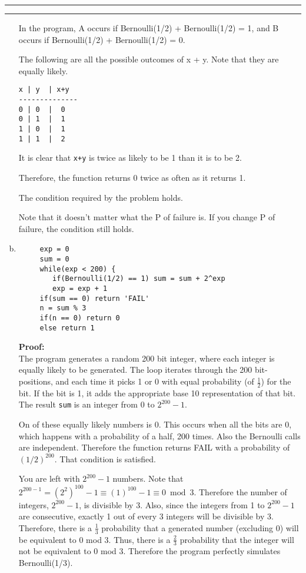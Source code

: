 \documentclass[11pt]{article}
\newcounter{questionCounter}
\newcounter{partCounter}[questionCounter]
\newenvironment{question}[2][\arabic{questionCounter}]{%
    \setcounter{partCounter}{0}%
    \vspace{.25in} \hrule \vspace{0.5em}%
        \noindent{\bf #2}%
    \vspace{0.8em} \hrule \vspace{.10in}%
    \addtocounter{questionCounter}{1}%
}{}
\begin{document}
\begin{question}{Don't Eat the Mushroom}
\begin{enumerate}[a.]
In the program, A occurs if Bernoulli(1/2) + Bernoulli(1/2) = 1,
and B occurs if Bernoulli(1/2) + Bernoulli(1/2) = 0.

The following are all the possible outcomes of x + y. Note that they are 
equally likely.

\begin{verbatim}
x | y  | x+y
--------------
0 | 0  |  0
0 | 1  |  1
1 | 0  |  1
1 | 1  |  2
\end{verbatim}

It is clear that \verb-x+y- is twice as likely to be 1 than it is to be 2.

Therefore, the function returns 0 twice as often as it returns 1.

The condition required by the problem holds.

Note that it doesn't matter what the P of failure is.
If you change P of failure, the condition still holds.

\item\begin{verbatim}
     exp = 0
     sum = 0
     while(exp < 200) {
        if(Bernoulli(1/2) == 1) sum = sum + 2^exp
        exp = exp + 1
     if(sum == 0) return 'FAIL'
     n = sum % 3
     if(n == 0) return 0
     else return 1
\end{verbatim}
\textbf{Proof:}\\
The program generates a random 200 bit integer, where each
integer is equally likely to be generated. The loop iterates through the 200 bit-positions,
and each time it picks 1 or 0 with equal probability (of $\frac{1}{2}$) for the bit.
If the bit is 1, it adds the appropriate base 10 representation of that bit.
The result \texttt{sum} is an integer from 0 to $2^{200} - 1$.

On of these equally likely numbers is 0. This occurs when all the bits are 0, which
happens with a probability of a half, 200 times. Also the Bernoulli calls are
independent. Therefore the function returns FAIL with a probability of $(1/2)^200$.
That condition is satisfied.

You are left with $2^{200}-1$ numbers. Note that $2^{200-1} = (2^{2})^{100} -1  \equiv (1)^{100} -1 \equiv 0 \bmod 3$.
Therefore the number of integers, $2^{200}-1$, is divisible by 3. Also, since
the integers from 1 to $2^{200}-1$ are consecutive,
exactly 1 out of every 3 integers will be divisible by 3. Therefore, there is a $\frac{1}{3}$ 
probability that a generated number (excluding 0) will be equivalent to 0 mod 3.
Thus, there is a $\frac{2}{3}$ probability that the integer will not be equivalent
 to 0 mod 3. Therefore the program perfectly simulates Bernoulli(1/3).


\end{enumerate}
\end{question}
\end{document}
